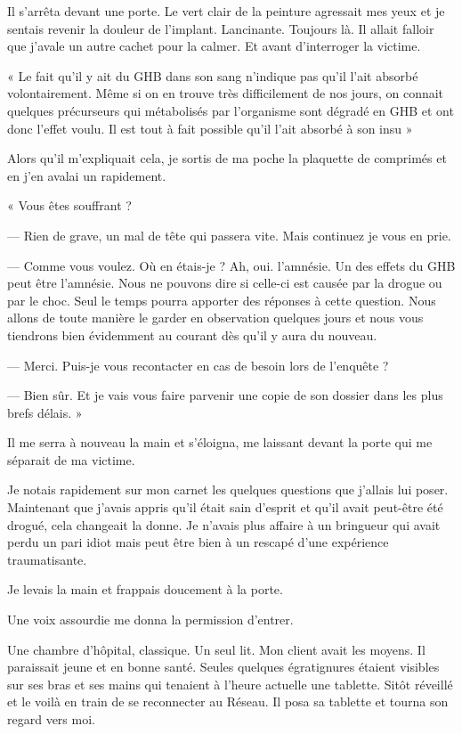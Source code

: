 Il s'arrêta devant une porte. Le vert clair de la peinture agressait mes yeux et je sentais revenir la douleur de
l'implant. Lancinante. Toujours là. Il allait falloir que j'avale un autre cachet pour la calmer. Et avant d'interroger
la victime.

« Le fait qu'il y ait du GHB dans son sang n'indique pas qu'il l'ait absorbé volontairement. Même si on en trouve très
difficilement de nos jours, on connait quelques précurseurs qui métabolisés par l'organisme sont dégradé en GHB et ont
donc l'effet voulu. Il est tout à fait possible qu'il l'ait absorbé à son insu »

Alors qu'il m'expliquait cela, je sortis de ma poche la plaquette de comprimés et en j'en avalai un rapidement.

« Vous êtes souffrant ?

— Rien de grave, un mal de tête qui passera vite. Mais continuez je vous en prie.

— Comme vous voulez. Où en étais-je ? Ah, oui. l'amnésie. Un des effets du GHB peut être l'amnésie. Nous ne pouvons
dire si celle-ci est causée par la drogue ou par le choc. Seul le temps pourra apporter des réponses à cette question.
Nous allons de toute manière le garder en observation quelques jours et nous vous tiendrons bien évidemment au courant
dès qu'il y aura du nouveau.

— Merci. Puis-je vous recontacter en cas de besoin lors de l'enquête ?

— Bien sûr. Et je vais vous faire parvenir une copie de son dossier dans les plus brefs délais. »

Il me serra à nouveau la main et s'éloigna, me laissant devant la porte qui me séparait de ma victime.

Je notais rapidement sur mon carnet les quelques questions que j'allais lui poser. Maintenant que j'avais appris qu'il
était sain d'esprit et qu'il avait peut-être été drogué, cela changeait la donne. Je n'avais plus affaire à un bringueur
qui avait perdu un pari idiot mais peut être bien à un rescapé d'une expérience traumatisante.

Je levais la main et frappais doucement à la porte.

Une voix assourdie me donna la permission d'entrer.

Une chambre d'hôpital, classique. Un seul lit. Mon client avait les moyens. Il paraissait jeune et en bonne santé.
Seules quelques égratignures étaient visibles sur ses bras et ses mains qui tenaient à l'heure actuelle une tablette.
Sitôt réveillé et le voilà en train de se reconnecter au Réseau. Il posa sa tablette et tourna son regard vers moi.

